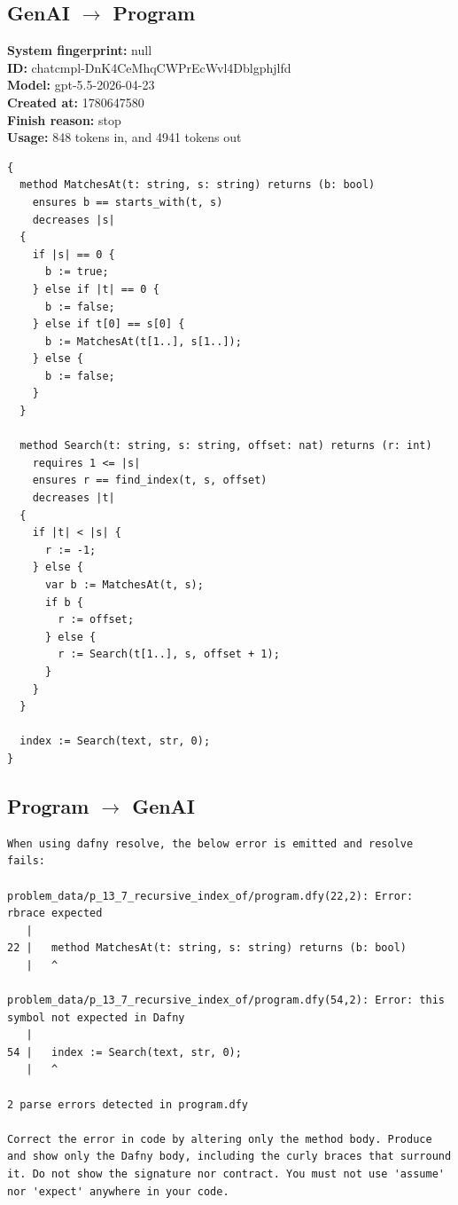 \documentclass{article}
\begin{document}
\subsection*{GenAI $\rightarrow$ Program}
\textbf{System fingerprint: }null
\\\textbf{ID: }chatcmpl-DnK4CeMhqCWPrEcWvl4Dblgphjlfd
\\\textbf{Model: }gpt-5.5-2026-04-23
\\\textbf{Created at: }1780647580
\\\textbf{Finish reason: }stop
\\\textbf{Usage: }848 tokens in, and 4941 tokens out
\begin{lstlisting}
{
  method MatchesAt(t: string, s: string) returns (b: bool)
    ensures b == starts_with(t, s)
    decreases |s|
  {
    if |s| == 0 {
      b := true;
    } else if |t| == 0 {
      b := false;
    } else if t[0] == s[0] {
      b := MatchesAt(t[1..], s[1..]);
    } else {
      b := false;
    }
  }

  method Search(t: string, s: string, offset: nat) returns (r: int)
    requires 1 <= |s|
    ensures r == find_index(t, s, offset)
    decreases |t|
  {
    if |t| < |s| {
      r := -1;
    } else {
      var b := MatchesAt(t, s);
      if b {
        r := offset;
      } else {
        r := Search(t[1..], s, offset + 1);
      }
    }
  }

  index := Search(text, str, 0);
}
\end{lstlisting}
\subsection*{Program $\rightarrow$ GenAI}
\begin{lstlisting}
When using dafny resolve, the below error is emitted and resolve fails:

problem_data/p_13_7_recursive_index_of/program.dfy(22,2): Error: rbrace expected
   |
22 |   method MatchesAt(t: string, s: string) returns (b: bool)
   |   ^

problem_data/p_13_7_recursive_index_of/program.dfy(54,2): Error: this symbol not expected in Dafny
   |
54 |   index := Search(text, str, 0);
   |   ^

2 parse errors detected in program.dfy

Correct the error in code by altering only the method body. Produce and show only the Dafny body, including the curly braces that surround it. Do not show the signature nor contract. You must not use 'assume' nor 'expect' anywhere in your code.
\end{lstlisting}
\end{document}
